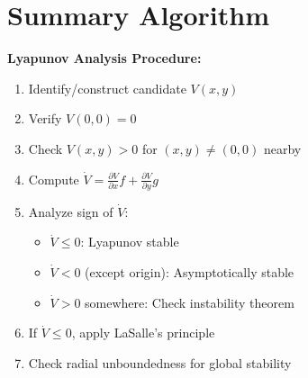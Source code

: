 \documentclass[12pt]{article}
\begin{document}
\section{Summary Algorithm}

\begin{mdframed}[linecolor=black, linewidth=1pt]
\textbf{Lyapunov Analysis Procedure:}
\begin{enumerate}
    \item Identify/construct candidate $V(x,y)$
    \item Verify $V(0,0) = 0$
    \item Check $V(x,y) > 0$ for $(x,y) \neq (0,0)$ nearby
    \item Compute $\dot{V} = \frac{\partial V}{\partial x}f + \frac{\partial V}{\partial y}g$
    \item Analyze sign of $\dot{V}$:
    \begin{itemize}
        \item $\dot{V} \leq 0$: Lyapunov stable
        \item $\dot{V} < 0$ (except origin): Asymptotically stable
        \item $\dot{V} > 0$ somewhere: Check instability theorem
    \end{itemize}
    \item If $\dot{V} \leq 0$, apply LaSalle's principle
    \item Check radial unboundedness for global stability
\end{enumerate}
\end{mdframed}
\end{document}
